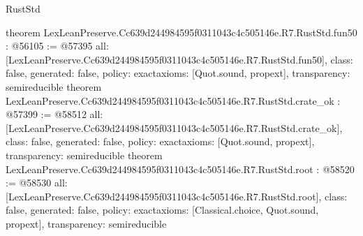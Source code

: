 \begin{lexlean}{RustStd}
\begin{coremodule}
{}
theorem LexLeanPreserve.Cc639d244984595f0311043c4c505146e.R7.RustStd.fun50 : @56105 := @57395 {
  all: [LexLeanPreserve.Cc639d244984595f0311043c4c505146e.R7.RustStd.fun50],
  class: false,
  generated: false,
  policy: exact{axioms: [Quot.sound, propext]},
  transparency: semireducible
}
theorem LexLeanPreserve.Cc639d244984595f0311043c4c505146e.R7.RustStd.crate_ok : @57399 := @58512 {
  all: [LexLeanPreserve.Cc639d244984595f0311043c4c505146e.R7.RustStd.crate_ok],
  class: false,
  generated: false,
  policy: exact{axioms: [Quot.sound, propext]},
  transparency: semireducible
}
theorem LexLeanPreserve.Cc639d244984595f0311043c4c505146e.R7.RustStd.root : @58520 := @58530 {
  all: [LexLeanPreserve.Cc639d244984595f0311043c4c505146e.R7.RustStd.root],
  class: false,
  generated: false,
  policy: exact{axioms: [Classical.choice, Quot.sound, propext]},
  transparency: semireducible
}


\end{coremodule}
\end{lexlean}
